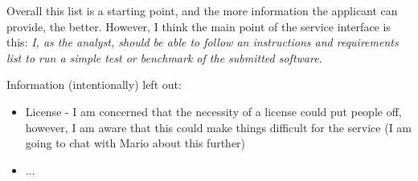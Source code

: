 Overall this list is a starting point, and the more information the applicant can provide, the better. However, I think the main point of the service interface is this: \emph{I, as the analyst, should be able to follow an instructions and requirements list to run a simple test or benchmark of the submitted software}.

Information (intentionally) left out:
\begin{itemize}
  \item License - I am concerned that the necessity of a license could put people off, however, I am aware that this could make things difficult for the service (I am going to chat with Mario about this further)
  \item ...
\end{itemize}